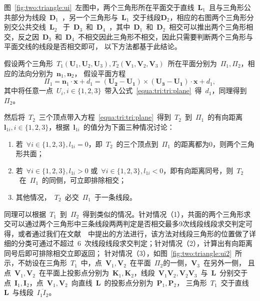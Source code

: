 图~\ref{fig:two:triangle:ui}~左图中，两个三角形所在平面交于直线~$\bm{L}_1$~且与三角形公共部分为线段~$\bm{D}_1$~，另一个三角形与~$\bm{L}_1$~交于线段$\bm{D}_2$，相应的右图两个三角形分别交公共交线~$\bm{L}_2$~
于~$\bm{D}_3$~和~$\bm{D}_4$~，其中~$\bm{D}_1$~和~$\bm{D}_2$~相交可以推出两个三角形相交，反之因~$\bm{D}_3$~和~$\bm{D}_4$~不相交因此三角形不相交，因此只需要判断两个三角形与平面交线的线段是否相交即可\cite{Moller1997}，
以下方法都基于此结论。

假设两个三角形~$T_1(\bm{U}_1,\bm{U}_2,\bm{U}_3), T_2(\bm{V}_1,\bm{V}_2,\bm{V}_3)$~所在平面分别为~$\Pi_1, \Pi_2$，相应的法向分别为~$\bm{n}_1, \bm{n}_2$，
假设平面方程~
\begin{equation}
  \Pi_1 = \bm{n}_1 \cdot \bm{x}+d_1 = (\bm{U_2} - \bm{U_1}) \times (\bm{U_3}-\bm{U_1})  \cdot \bm{x} + d_1,
\label{equa:tri:tri:plane}
\end{equation}
其中将任意一点~$U_i, i \in \{1,2,3\}$~带入公式~\ref{equa:tri:tri:plane}~得~$d_1$，同理得到~$\Pi_2$。

然后将~$T_2$~三个顶点带入方程~\ref{equa:tri:tri:plane}~得到~$T_2$~到~$\Pi_1$~的有向距离~$\bm{l}_{1i}, i \in \{1,2,3\}$，根据~$\bm{l}_{1i}$~的值分为下面三种情况讨论：
\begin{enumerate}[(1)]
  \item 若~$\forall i \in \{1,2,3\}, l_{1i} = 0$，即~$T_2$~的三个顶点到~$\Pi_1$~的距离都为0，则两个三角形共面；
  \item 若~$\forall i \in \{1,2,3\}, l_{1i} > 0$ 或~$\forall i \in \{1,2,3\}, l_{1i} < 0$，即有向距离同号，则~$T_2$~在~$\Pi_1$~的同侧，可立即排除相交；
  \item 其他情况，~$T_2$~必交~$\Pi_1$~于一条线段。
\end{enumerate}

同理可以根据~$T_1$~到~$\Pi_2$~得到类似的情况。针对情况（1），共面的两个三角形求交可以通过两个三角形中三条线段两两判定是否相交最多9次线段线段求交判定可得，或者通过我们在文献~~中提出的方法进行，该方法对线段三角形的位置做了详细的分类可通过不超过~6~次线段线段求交判定；针对情况（2），计算出有向距离同号后即可排除相交立即返回；
针对情况（3），如图~\ref{fig:two:triangle:ui2}~所示，不妨设在三角形~$T_1$~中，点~$\bm{V}_1, \bm{V}_2$~在平面~$\Pi_2$的一侧，$\bm{V}_3$~在另外一侧，
且点~$\bm{V}_1, \bm{V}_2$~在平面上投影点分别为~$\bm{K}_1,\bm{K}_2$，线段~$\bm{V}_1\bm{V}_2, \bm{V}_2\bm{V}_3$~与~$\bm{L}$~分别交于点~$\bm{I}_1,\bm{I}_2$，点~$\bm{V}_1,\bm{V}_2$~向直线~$\bm{L}$~的投影点分别为~$\bm{P}_1,\bm{P}_2$，
三角形~$T_1$~交于直线~$\bm{L}$~与线段~$\overline{I_1I_2}$。%

